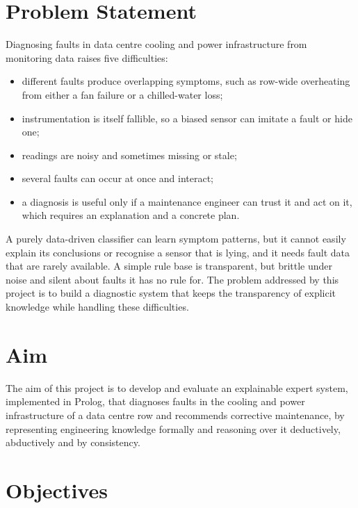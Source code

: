 \section{Problem Statement}
\label{sec:problem}

Diagnosing faults in data centre cooling and power infrastructure from monitoring data raises five difficulties:
\begin{itemize}
  \item different faults produce overlapping symptoms, such as row-wide overheating from either a fan failure or a chilled-water loss;
  \item instrumentation is itself fallible, so a biased sensor can imitate a fault or hide one;
  \item readings are noisy and sometimes missing or stale;
  \item several faults can occur at once and interact;
  \item a diagnosis is useful only if a maintenance engineer can trust it and act on it, which requires an explanation and a concrete plan.
\end{itemize}
A purely data-driven classifier can learn symptom patterns, but it cannot easily explain its conclusions or recognise a sensor that is lying, and it needs fault data that are rarely available. A simple rule base is transparent, but brittle under noise and silent about faults it has no rule for. The problem addressed by this project is to build a diagnostic system that keeps the transparency of explicit knowledge while handling these difficulties.

\section{Aim}
\label{sec:aim}

The aim of this project is to develop and evaluate an explainable expert system, implemented in Prolog, that diagnoses faults in the cooling and power infrastructure of a data centre row and recommends corrective maintenance, by representing engineering knowledge formally and reasoning over it deductively, abductively and by consistency.

\section{Objectives}
\label{sec:objectives}

